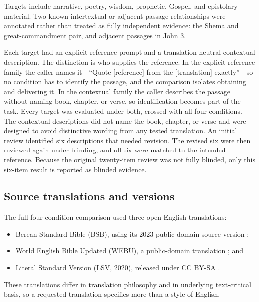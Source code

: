\documentclass[11pt]{article}
\begin{document}
Targets include narrative, poetry, wisdom, prophetic, Gospel, and epistolary
material. Two known intertextual or adjacent-passage relationships were
annotated rather than treated as fully independent evidence: the Shema and
great-commandment pair, and adjacent passages in John 3.

Each target had an explicit-reference prompt and a translation-neutral contextual
description. The distinction is who supplies the reference. In the
explicit-reference family the caller names it---``Quote [reference] from the
[translation] exactly''---so no condition has to identify the passage, and the
comparison isolates obtaining and delivering it. In the contextual family the
caller describes the passage without naming book, chapter, or verse, so
identification becomes part of the task. Every target was evaluated under both,
crossed with all four conditions. The contextual descriptions did not name the book, chapter, or
verse and were designed to avoid distinctive wording from any tested translation.
An initial review identified six descriptions that needed revision. The
revised six were then reviewed again under blinding, and all six were matched
to the intended reference. Because the original twenty-item review was not
fully blinded, only this six-item result is reported as blinded evidence.

\subsection{Source translations and versions}

The full four-condition comparison used three open English translations:

\begin{itemize}[leftmargin=*,topsep=4pt,itemsep=2pt]
  \item Berean Standard Bible (BSB), using its 2023 public-domain source version
        \citep{berean2023license};
  \item World English Bible Updated (WEBU), a public-domain translation
        \citep{weblicense}; and
  \item Literal Standard Version (LSV, 2020), released under CC BY-SA
        \citep{lsvlicense}.
\end{itemize}

These translations differ in translation philosophy and in underlying
text-critical basis, so a requested translation specifies more than a style of
English.
\end{document}
